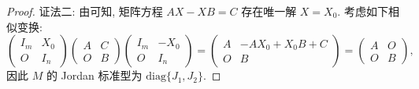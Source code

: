 \documentclass[../../main.tex]{subfiles}%
\begin{document}
\begin{proof}
{\color{blue}证法二:}
由可知, 矩阵方程 $AX - XB = C$ 存在唯一解 $X = X_0$. 考虑如下相似变换:
\[
\begin{pmatrix}I_m & X_0 \\ O & I_n\end{pmatrix}
\begin{pmatrix}A & C \\ O & B\end{pmatrix}
\begin{pmatrix}I_m & -X_0 \\ O & I_n\end{pmatrix}
=
\begin{pmatrix}A & -AX_0 + X_0B + C \\ O & B\end{pmatrix}
=
\begin{pmatrix}A & O \\ O & B\end{pmatrix},
\]
因此 $M$ 的 Jordan 标准型为 $\mathrm{diag}\{J_1,J_2\}$. 

\end{proof}
\end{document}
